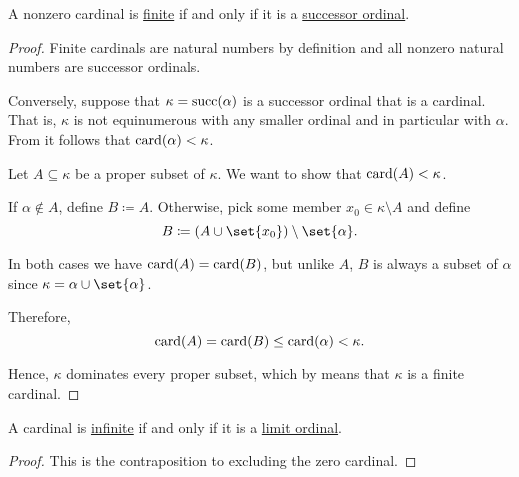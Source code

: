 \begin{proposition}\label{thm:cardinal_is_finite_iff_successor_ordinal}
  A nonzero cardinal is \hyperref[def:set_finiteness]{finite} if and only if it is a \hyperref[def:successor_and_limit_ordinal]{successor ordinal}.
\end{proposition}
\begin{proof}
  Finite cardinals are natural numbers by definition and all nonzero natural numbers are successor ordinals.

  Conversely, suppose that \( \kappa = \operatorname{succ}(\alpha) \) is a successor ordinal that is a cardinal. That is, \( \kappa \) is not equinumerous with any smaller ordinal and in particular with \( \alpha \). From  it follows that \( \operatorname{card}(\alpha) < \kappa \).

  Let \( A \subseteq \kappa \) be a proper subset of \( \kappa \). We want to show that \( \operatorname{card}(A) < \kappa \).

  If \( \alpha \not\in A \), define \( B \coloneqq A \). Otherwise, pick some member \( x_0 \in \kappa \setminus A \) and define
  \begin{equation*}
    B \coloneqq (A \cup \set{ x_0 }) \setminus \set{ \alpha }.
  \end{equation*}

  In both cases we have \( \operatorname{card}(A) = \operatorname{card}(B) \), but unlike \( A \), \( B \) is always a subset of \( \alpha \) since \( \kappa = \alpha \cup \set{ \alpha } \).

  Therefore,
  \begin{equation*}
    \operatorname{card}(A) = \operatorname{card}(B) \leq \operatorname{card}(\alpha) < \kappa.
  \end{equation*}

  Hence, \( \kappa \) dominates every proper subset, which by  means that \( \kappa \) is a finite cardinal.
\end{proof}

\begin{corollary}\label{thm:cardinal_is_infinite_iff_limit_ordinal}
  A cardinal is \hyperref[def:set_finiteness]{infinite} if and only if it is a \hyperref[def:successor_and_limit_ordinal]{limit ordinal}.
\end{corollary}
\begin{proof}
  This is the contraposition to  excluding the zero cardinal.
\end{proof}

